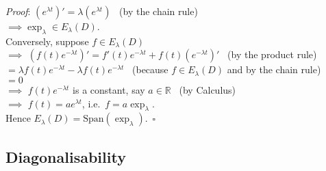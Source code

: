 \documentclass[
  12pt,
  a4paper,
  twoside]{article}
\theoremstyle{plain}
\theoremstyle{definition}
\begin{document}
\emph{Proof}:
\((e^{\lambda t})' = \lambda (e^{\lambda t})\) \hfill~{(by the chain rule)}\\
\(\implies \exp_{\lambda} \in E_{\lambda}(D)\).\\
Conversely, suppose \(f \in E_{\lambda}(D)\)\\
\(\implies\) \((f(t) e^{-\lambda t})' = f'(t) e^{-\lambda t} + f(t)(e^{-\lambda t})'\) \hfill~{(by the product rule)}\\
\hspace*{0.333em}\hspace*{0.333em}\hspace*{0.333em}\hspace*{0.333em}\hspace*{0.333em}\hspace*{0.333em}\hspace*{0.333em}\hspace*{0.333em}\hspace*{0.333em}\hspace*{0.333em}\hspace*{0.333em}\hspace*{0.333em} \(= \lambda f(t) e^{-\lambda t} - \lambda f(t) e^{-\lambda t}\) \hfill~{(because \(f \in E_{\lambda}(D)\) and by the chain rule)}\\
\hspace*{0.333em}\hspace*{0.333em}\hspace*{0.333em}\hspace*{0.333em}\hspace*{0.333em}\hspace*{0.333em}\hspace*{0.333em}\hspace*{0.333em}\hspace*{0.333em}\hspace*{0.333em}\hspace*{0.333em}\hspace*{0.333em} \(= 0\)\\
\(\implies\) \(f(t) e^{-\lambda t}\) is a constant, say \(a \in \mathbb{R}\) \hfill~{(by Calculus)}\\
\(\implies\) \(f(t) = a e^{\lambda t}\), i.e.~\(f=a\exp_{\lambda}\).\\
Hence \(E_{\lambda}(D) = \mathrm{Span} ( \exp_{\lambda} )\).\hfill~{\(\square\)}

\hypertarget{ss-diag-defn}{%
\subsection{Diagonalisability}\label{ss-diag-defn}}
\end{document}
